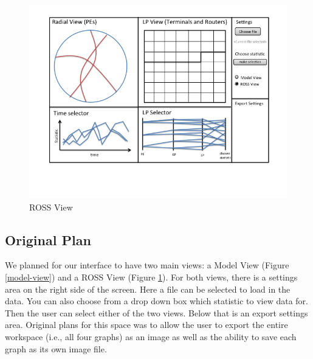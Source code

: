 \documentclass{acm_proc_article-sp}
\begin{document}
\begin{figure}[t]
\centering
   \includegraphics[width=5.0in, clip=true, trim=0 1in 0 0]{../../figures/gui-diagram/Slide2.png}
\caption{ROSS View}
\label{ross-view}
\end{figure}
\subsection{Original Plan}
We planned for our interface to have two main views: a Model View (Figure \ref{model-view}) and a ROSS View (Figure \ref{ross-view}).  For both views, there is a settings area on the right side of the screen.  Here a file can be selected to load in the data.  You can also choose from a drop down box which statistic to view data for.  Then the user can select either of the two views.  Below that is an export settings area. Original plans for this space was to allow the user to export the entire workspace (i.e., all four graphs) as an image as well as the ability to save each graph as its own image file.  
\end{document}
